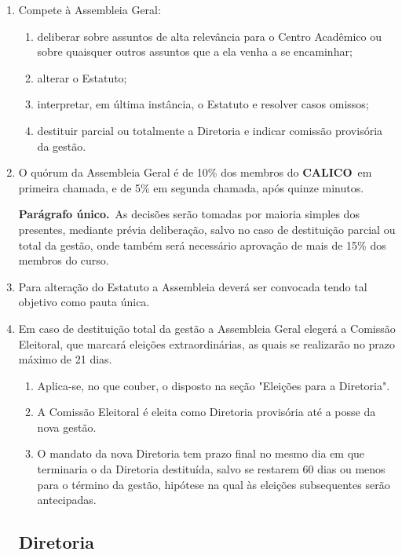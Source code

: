 \documentclass[12pt,a4paper]{article}
\newcommand{\calico}{\textbf{CALICO}}
\newcommand{\parun}{\textbf{Parágrafo único.}\ }
\begin{document}
\begin{enumerate}[label=\textbf{Art. \arabic*º.}]
    \item Compete à Assembleia Geral:
    \begin{enumerate}[label=\textbf{\Roman* - }]
        \item deliberar sobre assuntos de alta relevância para o Centro Acadêmico ou sobre quaisquer outros assuntos que a ela venha a se encaminhar;
        \item alterar o Estatuto;
        \item interpretar, em última instância, o Estatuto e resolver casos omissos;
        \item destituir parcial ou totalmente a Diretoria e indicar comissão provisória da gestão.
    \end{enumerate}

    \item O quórum da Assembleia Geral é de 10\% dos membros do \calico\ em primeira chamada, e de 5\% em segunda chamada, após quinze minutos.
    
    \parun As decisões serão tomadas por maioria simples dos presentes, mediante prévia deliberação, salvo no caso de destituição parcial ou total da gestão, onde também será necessário aprovação de mais de 15\% dos membros do curso.
    
    \item Para alteração do Estatuto a Assembleia deverá ser convocada tendo tal objetivo como pauta única.
    
    \item Em caso de destituição total da gestão a Assembleia Geral elegerá a Comissão Eleitoral, que marcará eleições extraordinárias, as quais se realizarão no prazo máximo de 21 dias.
    \begin{enumerate}[label=\textbf{\S\arabic*º.}]
        \item{Aplica-se, no que couber, o disposto na seção "Eleições para a Diretoria".}
        \item{A Comissão Eleitoral é eleita como Diretoria provisória até a posse da nova gestão.}
        \item{O mandato da nova Diretoria tem prazo final no mesmo dia em que terminaria o da Diretoria destituída, salvo se restarem 60 dias ou menos para o término da gestão, hipótese na qual às eleições subsequentes serão antecipadas.}
     \end{enumerate}
    

    
\subsection{Diretoria}


\end{enumerate}
\end{document}
